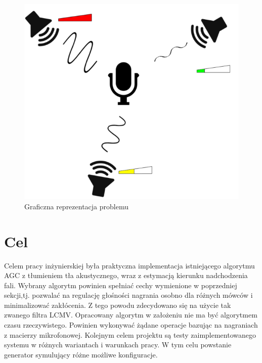\begin{figure}[h]
    \centering
    \includegraphics[width=\textwidth]{Images/setup.png}
    \caption{Graficzna reprezentacja problemu}
    \label{fig:setup}
\end{figure}

\section{Cel}
Celem pracy inżynierskiej była praktyczna implementacja istniejącego algorytmu AGC z tłumieniem tła akustycznego, wraz z estymacją kierunku nadchodzenia fali. Wybrany algorytm powinien spełniać cechy wymienione w poprzedniej sekcji,tj. pozwalać na regulację głośności nagrania osobno dla różnych mówców i minimalizować zakłócenia. Z tego powodu zdecydowano się na użycie tak zwanego filtra LCMV. Opracowany algorytm w założeniu nie ma być algorytmem czasu rzeczywistego. Powinien wykonywać żądane operacje bazując na nagraniach z macierzy mikrofonowej. Kolejnym celem projektu są testy zaimplementowanego systemu w różnych wariantach i warunkach pracy. W tym celu powstanie generator symulujący różne możliwe konfiguracje.

